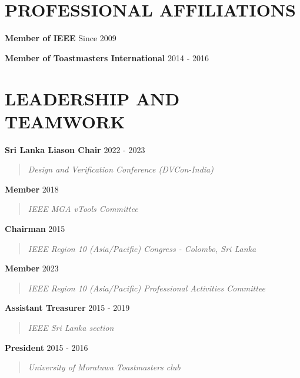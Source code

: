 \documentclass[mm]{./assets/res} %
\begin{document}
\begin{resume}
\section{PROFESSIONAL AFFILIATIONS} 

\textbf{Member of IEEE} \hfill Since 2009 


\textbf{Member of Toastmasters International} \hfill 2014 - 2016

\vspace{2 mm}
\section{LEADERSHIP AND TEAMWORK} 

\textbf{Sri Lanka Liason Chair} \hfill 2022 - 2023 
\begin{quote}
	\emph{Design and Verification Conference (DVCon-India)}
\end{quote}

\textbf{Member} \hfill 2018 
\begin{quote}
\emph{IEEE MGA vTools Committee}
\end{quote}

\textbf{Chairman} \hfill 2015 
\begin{quote}
\emph{IEEE Region 10 (Asia/Pacific) Congress - Colombo, Sri Lanka}
\end{quote}

\textbf{Member} \hfill 2023 
\begin{quote}
	\emph{IEEE Region 10 (Asia/Pacific) Professional Activities Committee}
\end{quote}

\textbf{Assistant Treasurer} \hfill 2015 - 2019
\begin{quote}
\emph{IEEE Sri Lanka section}
\end{quote}


\textbf{President} \hfill 2015 - 2016 
\begin{quote}
\emph{University of Moratuwa Toastmasters club}
\end{quote}


\end{resume}
\end{document}
